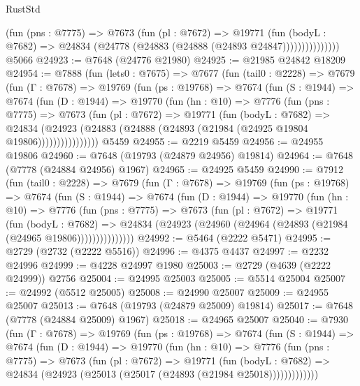 \begin{lexlean}{RustStd}
\begin{coremodule}
{\begin{coremodule}
{{{{{{{{{{{{{{{{{{{{{{{{{{{{{{{{{{{{{{{{{{{{{{{{{{{{{                    (fun (pns : @7775) =>
                    @7673
                      (fun (pl : @7672) =>
                      @19771
                        (fun (bodyL : @7682) =>
                        @24834 (@24778 (@24883 (@24888 (@24893 @24847)))))))))))))))
    @5066
@24923 := @7648 (@24776 @21980)
@24925 := @21985 @24842 @18209
@24954 := @7888
    (fun (lets0 : @7675) =>
    @7677
      (fun (tail0 : @2228) =>
      @7679
        (fun (Γ : @7678) =>
        @19769
          (fun (ps : @19768) =>
          @7674
            (fun (S : @1944) =>
            @7674
              (fun (D : @1944) =>
              @19770
                (fun (hn : @10) =>
                @7776
                  (fun (pns : @7775) =>
                  @7673
                    (fun (pl : @7672) =>
                    @19771
                      (fun (bodyL : @7682) =>
                      @24834
                        (@24923
                          (@24883 (@24888 (@24893 (@21984 (@24925 @19804 @19806))))))))))))))))
    @5459
@24955 := @2219 @5459
@24956 := @24955 @19806
@24960 := @7648 (@19793 (@24879 @24956) @19814)
@24964 := @7648 (@7778 (@24884 @24956) @1967)
@24965 := @24925 @5459
@24990 := @7912
    (fun (tail0 : @2228) =>
    @7679
      (fun (Γ : @7678) =>
      @19769
        (fun (ps : @19768) =>
        @7674
          (fun (S : @1944) =>
          @7674
            (fun (D : @1944) =>
            @19770
              (fun (hn : @10) =>
              @7776
                (fun (pns : @7775) =>
                @7673
                  (fun (pl : @7672) =>
                  @19771
                    (fun (bodyL : @7682) =>
                    @24834 (@24923 (@24960 (@24964 (@24893 (@21984 (@24965 @19806)))))))))))))))
@24992 := @5464 (@2222 @5471)
@24995 := @2729 (@2732 (@2222 @5516))
@24996 := @4375 @4437
@24997 := @2232 @24996
@24999 := @4228 @24997 @1980
@25003 := @2729 (@4639 (@2222 @24999)) @2756
@25004 := @24995 @25003
@25005 := @5514 @25004
@25007 := @24992 (@5512 @25005)
@25008 := @24990 @25007
@25009 := @24955 @25007
@25013 := @7648 (@19793 (@24879 @25009) @19814)
@25017 := @7648 (@7778 (@24884 @25009) @1967)
@25018 := @24965 @25007
@25040 := @7930
    (fun (Γ : @7678) =>
    @19769
      (fun (ps : @19768) =>
      @7674
        (fun (S : @1944) =>
        @7674
          (fun (D : @1944) =>
          @19770
            (fun (hn : @10) =>
            @7776
              (fun (pns : @7775) =>
              @7673
                (fun (pl : @7672) =>
                @19771
                  (fun (bodyL : @7682) =>
                  @24834 (@24923 (@25013 (@25017 (@24893 (@21984 @25018)))))))))))))
}}}}}}}}}}}}}}}}}}}}}}}}}}}}}}}}}}}}}}}}}}}}}}}}}}}}}
\end{coremodule}}
\end{coremodule}
\end{lexlean}
